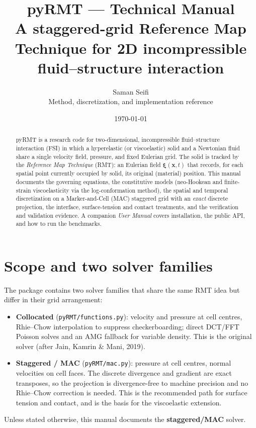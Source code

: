 \documentclass[11pt]{article}
\title{\textbf{pyRMT --- Technical Manual}\\[2mm]
\large A staggered-grid Reference Map Technique for 2D incompressible
fluid--structure interaction}
\author{Saman Seifi \\ \small Method, discretization, and implementation reference}
\date{\today}
\newcommand{\xv}{\bm{x}}
\newcommand{\xiv}{\bm{\xi}}
\begin{document}
\maketitle
\begin{abstract}
\noindent
pyRMT is a research code for two-dimensional, incompressible fluid--structure
interaction (FSI) in which a hyperelastic (or viscoelastic) solid and a Newtonian
fluid share a single velocity field, pressure, and fixed Eulerian grid. The solid
is tracked by the \emph{Reference Map Technique} (RMT): an Eulerian field
$\xiv(\xv,t)$ that records, for each spatial point currently occupied by solid,
its original (material) position. This manual documents the governing equations,
the constitutive models (neo-Hookean and finite-strain viscoelasticity via the
log-conformation method), the spatial and temporal discretization on a
Marker-and-Cell (MAC) staggered grid with an \emph{exact} discrete projection, the
interface, surface-tension and contact treatments, and the verification and
validation evidence. A companion \emph{User Manual} covers installation, the public
API, and how to run the benchmarks.
\end{abstract}

\tableofcontents

\section{Scope and two solver families}
The package contains two solver families that share the same RMT idea but differ in
their grid arrangement:
\begin{itemize}[nosep]
  \item \textbf{Collocated} (\texttt{pyRMT/functions.py}): velocity and pressure at
  cell centres, Rhie--Chow interpolation to suppress checkerboarding; direct DCT/FFT
  Poisson solves and an AMG fallback for variable density. This is the original
  solver (after Jain, Kamrin \& Mani, 2019).
  \item \textbf{Staggered / MAC} (\texttt{pyRMT/mac.py}): pressure at cell centres,
  normal velocities on cell faces. The discrete divergence and gradient are exact
  transposes, so the projection is divergence-free to machine precision and no
  Rhie--Chow correction is needed. This is the recommended path for surface tension
  and contact, and is the basis for the viscoelastic extension.
\end{itemize}
Unless stated otherwise, this manual documents the \textbf{staggered/MAC} solver.
\end{document}
